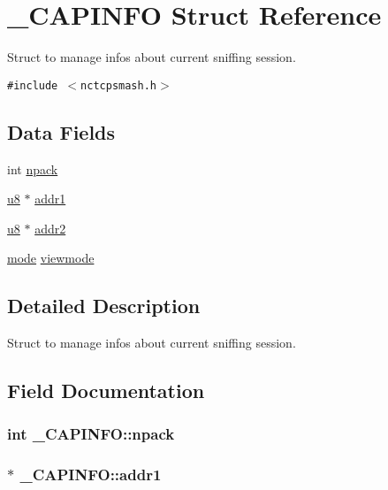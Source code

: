 \hypertarget{struct__CAPINFO}{
\section{\_\-CAPINFO Struct Reference}
\label{struct__CAPINFO}
}
Struct to manage infos about current sniffing session.  


{\tt \#include $<$nctcpsmash.h$>$}

\subsection*{Data Fields}
\begin{CompactItemize}
\item 
int \hyperlink{struct__CAPINFO_6682cfb41d7803415ea02f8a2a9776b9}{npack}
\item 
\hyperlink{nctcpsmash_8h_ed742c436da53c1080638ce6ef7d13de}{u8} $\ast$ \hyperlink{struct__CAPINFO_f275ad277f6a80bff93bd40220762b4b}{addr1}
\item 
\hyperlink{nctcpsmash_8h_ed742c436da53c1080638ce6ef7d13de}{u8} $\ast$ \hyperlink{struct__CAPINFO_219c7cc447a511ec60e94547e2677f52}{addr2}
\item 
\hyperlink{nctcpsmash_8h_1a6b6fb557d8d37d59700faf4e4c9167}{mode} \hyperlink{struct__CAPINFO_e2469703229ab23ccdc5c54465524492}{viewmode}
\end{CompactItemize}


\subsection{Detailed Description}
Struct to manage infos about current sniffing session. 

\subsection{Field Documentation}
\hypertarget{struct__CAPINFO_6682cfb41d7803415ea02f8a2a9776b9}{
\subsubsection{\setlength{\rightskip}{0pt plus 5cm}int {\bf \_\-CAPINFO::npack}}}
\label{struct__CAPINFO_6682cfb41d7803415ea02f8a2a9776b9}


\hypertarget{struct__CAPINFO_f275ad277f6a80bff93bd40220762b4b}{
\subsubsection{$\ast$ {\bf \_\-CAPINFO::addr1}}}
\label{struct__CAPINFO_f275ad277f6a80bff93bd40220762b4b}


